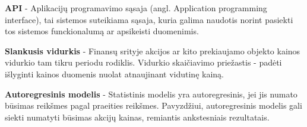 \documentclass{VUMIFInfKursinis}
\begin{document}
\textbf{API} - Aplikacijų programavimo sąsaja (angl. Application programming interface), tai sistemos suteikiama sąsaja, kuria galima naudotis norint pasiekti tos sistemos
funckionalumą ar apsikeisti duomenimis.

\textbf{Slankusis vidurkis} - Finansų srityje akcijos ar kito prekiaujamo objekto kainos vidurkio tam tikru periodu rodiklis. Vidurkio skaičiavimo priežastis - padėti išlyginti
kainos duomenis nuolat atnaujinant vidutinę kainą.

\textbf{Autoregresinis modelis} - Statistinis modelis yra autoregresinis, jei jis numato būsimas reikšmes pagal praeities reikšmes. Pavyzdžiui, autoregresinis modelis gali
siekti numatyti būsimas akcijų kainas, remiantis ankstesniais rezultatais.

\printbibliography[heading=bibintoc] %

\appendix  %

\end{document}
